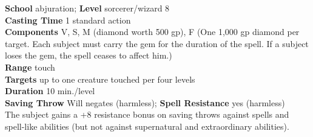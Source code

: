 \textbf{School} abjuration; \textbf{Level }sorcerer/wizard 8\\
\textbf{Casting Time} 1 standard action\\
\textbf{Components} V, S, M (diamond worth 500 gp), F (One 1,000 gp diamond per target. Each subject must carry the gem for the duration of the spell. If a subject loses the gem, the spell ceases to affect him.)\\
\textbf{Range} touch\\
\textbf{Targets} up to one creature touched per four levels\\
\textbf{Duration} 10 min./level\\
\textbf{Saving Throw }Will negates (harmless); \textbf{Spell Resistance} yes (harmless)\\
The subject gains a +8 resistance bonus on saving throws against spells and spell-like abilities (but not against supernatural and extraordinary abilities).\\
